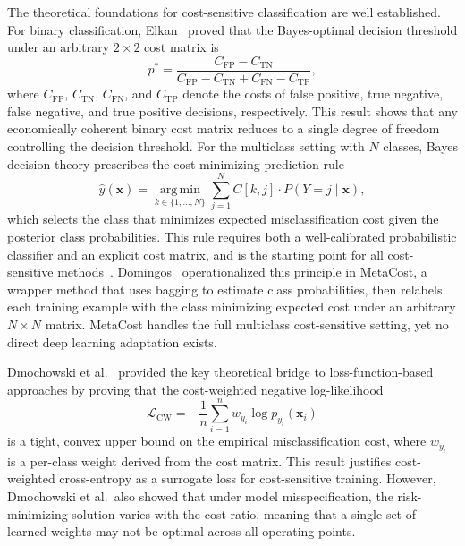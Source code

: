 \documentclass[11pt, letterpaper]{article}
\begin{document}
The theoretical foundations for cost-sensitive classification are well
established. For binary classification, Elkan~\cite{elkan2001} proved that the
Bayes-optimal decision threshold under an arbitrary $2 \times 2$ cost matrix is
%
\begin{equation}
\label{eq:elkan_threshold}
p^{*} = \frac{C_{\mathrm{FP}} - C_{\mathrm{TN}}}
            {C_{\mathrm{FP}} - C_{\mathrm{TN}} + C_{\mathrm{FN}} - C_{\mathrm{TP}}},
\end{equation}
%
where $C_{\mathrm{FP}}$, $C_{\mathrm{TN}}$, $C_{\mathrm{FN}}$, and
$C_{\mathrm{TP}}$ denote the costs of false positive, true negative, false
negative, and true positive decisions, respectively. This result shows that any
economically coherent binary cost matrix reduces to a single degree of freedom
controlling the decision threshold. For the multiclass setting with $N$ classes,
Bayes decision theory prescribes the cost-minimizing prediction rule
%
\begin{equation}
\label{eq:bayes_cost_rule}
\hat{y}(\mathbf{x}) = \operatorname*{arg\,min}_{k \in \{1,\dots,N\}}
  \sum_{j=1}^{N} C[k,j] \cdot P(Y = j \mid \mathbf{x}),
\end{equation}
%
which selects the class that minimizes expected misclassification cost given the
posterior class probabilities. This rule requires both a well-calibrated
probabilistic classifier and an explicit cost matrix, and is the starting point
for all cost-sensitive
methods~\cite{elkan2001,domingos1999metacost}. Domingos~\cite{domingos1999metacost}
operationalized this principle in MetaCost, a wrapper method that uses bagging
to estimate class probabilities, then relabels each training example with the
class minimizing expected cost under an arbitrary $N \times N$ matrix. MetaCost
handles the full multiclass cost-sensitive setting, yet no direct deep learning
adaptation exists.

Dmochowski et al.~\cite{dmochowski2010jmlr} provided the key theoretical bridge
to loss-function-based approaches by proving that the cost-weighted negative
log-likelihood
%
\begin{equation}
\label{eq:cost_weighted_ce}
\mathcal{L}_{\mathrm{CW}} = -\frac{1}{n}\sum_{i=1}^{n}
  w_{y_i} \log p_{y_i}(\mathbf{x}_i)
\end{equation}
%
is a tight, convex upper bound on the empirical misclassification cost, where
$w_{y_i}$ is a per-class weight derived from the cost matrix. This result
justifies cost-weighted cross-entropy as a surrogate loss for cost-sensitive
training. However, Dmochowski et al.\ also showed that under model
misspecification, the risk-minimizing solution varies with the cost ratio,
meaning that a single set of learned weights may not be optimal across all
operating points.
\end{document}
